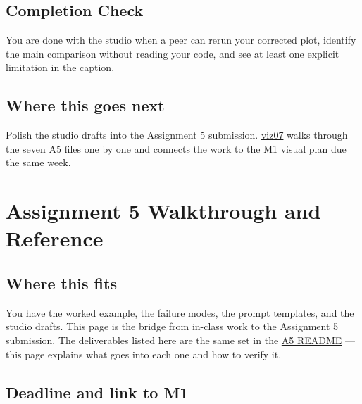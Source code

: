 \documentclass[
  letterpaper,
  DIV=11,
  numbers=noendperiod,
  oneside]{scrreprt}
\begin{document}
\section*{Completion Check}\label{completion-check}


You are done with the studio when a peer can rerun your corrected plot,
identify the main comparison without reading your code, and see at least
one explicit limitation in the caption.

\section*{Where this goes next}\label{where-this-goes-next-5}


Polish the studio drafts into the Assignment 5 submission.
\href{viz07-assignment-a5-and-reference.qmd}{viz07} walks through the
seven A5 files one by one and connects the work to the M1 visual plan
due the same week.

\chapter*{Assignment 5 Walkthrough and
Reference}\label{assignment-5-walkthrough-and-reference}


\section*{Where this fits}\label{where-this-fits-5}


You have the worked example, the failure modes, the prompt templates,
and the studio drafts. This page is the bridge from in-class work to the
Assignment 5 submission. The deliverables listed here are the same set
in the \href{../../assignments/assignment05-visualization/README.md}{A5
README} --- this page explains what goes into each one and how to verify
it.

\section*{Deadline and link to M1}\label{deadline-and-link-to-m1}
\end{document}
